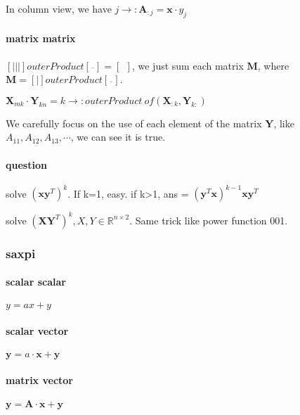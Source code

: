 \documentclass[UTF8]{../../09-Mathematics}
\begin{document}
In column view, we have $j \rightarrow : \boldsymbol A _{:j} = \boldsymbol x \cdot  y_j$

\paragraph{matrix matrix}


$ [|||]  outerProduct [\overline{\ \ } ] =  [ \ \ ]$, we just sum each matrix $\boldsymbol M$, where $\boldsymbol M =[|]  outerProduct [\overline{\ \ } ]  $.

$\boldsymbol X_{mk} \cdot \boldsymbol Y_{kn} = k \rightarrow : outerProduct \ of (\boldsymbol X_{:k}, \boldsymbol  Y_{k:})$

We carefully focus on the use of each element of the matrix $\boldsymbol Y$, like  $A_{11}, A_{12},A_{13}, \cdots$, we can see it is true.


\paragraph{question }

solve $(\boldsymbol x \boldsymbol y^T)^k$. If k=1, easy. if k>1, ans = $ (\boldsymbol y^T \boldsymbol x )^{k-1}  \boldsymbol x \boldsymbol y^T$


solve $(\boldsymbol X \boldsymbol Y^T)^k, X,Y \in \mathbb{R}^{n \times 2}$. Same trick like power function 001.


\subsubsection{saxpi}

\paragraph{scalar scalar}
$y = ax + y$

\paragraph{scalar vector}
$ \boldsymbol y = a \cdot  \boldsymbol  x + \boldsymbol y$


\paragraph{matrix vector}
$ \boldsymbol y = \boldsymbol A \cdot  \boldsymbol  x + \boldsymbol y$
\end{document}
